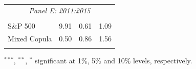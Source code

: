 \documentclass[pdf,10pt,xcolor=dvipsnames,hide notes]{beamer}
\begin{document}
\begin{frame}
\begin{threeparttable}[H]
\begin{tabularx}{\textwidth}{@{\extracolsep{\fill}}llll@{}}
		\multicolumn{4}{c}{\textit{Panel E: 2011:2015}} \\
		&       &       &       \\
		S\&P 500 & 9.91  & 0.61  & 1.09 \\
		Mixed Copula & 0.50  & 0.86  & 1.56 \\
		\multicolumn{1}{r}{} & \multicolumn{1}{r}{} & \multicolumn{1}{r}{} & \multicolumn{1}{r}{} \\
		\bottomrule
	\end{tabularx}%
	\begin{tablenotes}
		\item \scriptsize $^{\ast\ast\ast}$, $^{\ast\ast}$, $^{\ast}$  significant at 1\%, 5\% and 10\% levels, respectively.
	\end{tablenotes}
	\label{tab:table110}%
\end{threeparttable}%

\end{frame}
\end{document}
